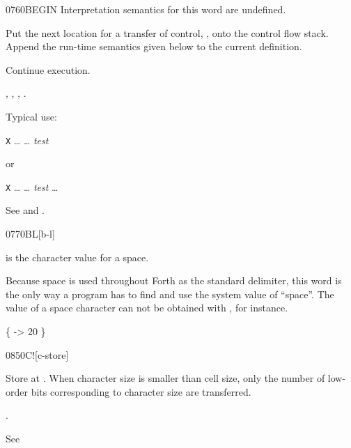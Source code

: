 \begin{worddef}{0760}{BEGIN}
\interpret
	Interpretation semantics for this word are undefined.

\compile

	Put the next location for a transfer of control, , onto
	the control flow stack. Append the run-time semantics given below
	to the current definition.

\runtime
	\stack{}{}

	Continue execution.

\see {},
	,
	,
	.

	\begin{defer}
	\rationale %
		Typical use:

		\tab \word{:} \texttt{X} {\ldots}
			 {\ldots} \emph{test} 
		\word{;}

		or

		\tab \word{:} \texttt{X} {\ldots}
			 {\ldots}
			\emph{test}  {\ldots}
		\word{;}

	\testing\rmfamily
		See  and .
	\end{defer}
\end{worddef}


\begin{worddef}{0770}{BL}[b-l]
\item {}

	 is the character value for a space.

	\begin{defer}
	\rationale %
		Because space is used throughout Forth as the standard
		delimiter, this word is the only way a program has to find and
		use the system value of ``space''. The value of a space
		character can not be obtained with , for instance.

	\testing
		\{  -> 20 \}
	\end{defer}
\end{worddef}


\begin{worddef}{0850}{C!}[c-store]
\item {}

	Store  at . When character size is smaller
	than cell size, only the number of low-order bits corresponding to
	character size are transferred.

\see {}.

	\begin{defer}
	\testing
		\rmfamily
		See \rref{core:C,}{C,}
	\end{defer}
\end{worddef}



